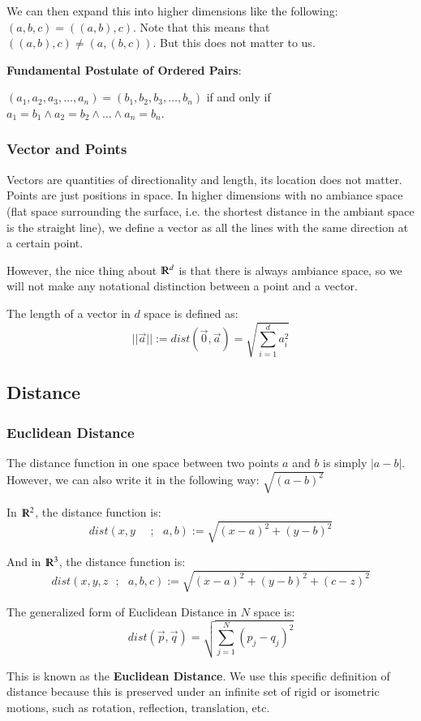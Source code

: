 \documentclass [12 pt, twoside] {book}
\newcommand\+{\text{ }}
\begin{document}
We can then expand this into higher dimensions like the following:
$(a, b, c) = ((a, b), c)$. Note that this means that $((a, b), c) \neq (a, (b,
c))$. But this does not matter to us.

\textbf{Fundamental Postulate of Ordered Pairs}:

$(a_1, a_2, a_3, \dots, a_n) = (b_1, b_2, b_3, \dots, b_n)$ if and only if $a_1
= b_1 \wedge a_2 = b_2 \wedge \dots \wedge a_n = b_n$.
\subsubsection{Vector and Points}
Vectors are quantities of directionality and length, its location does not
matter. Points are just positions in space. In higher dimensions with no
ambiance space (flat space surrounding the surface, i.e. the shortest distance
in the ambiant space is the straight line),  we define a vector as all
the lines with the same direction at a certain point.

However, the nice thing about $\varmathbb{R}^d$ is that there is always ambiance
space, so we will not make any notational distinction between a point and a
vector.

The length of a vector in $d$ space is defined as:
$$||\vec{a}|| := dist(\vec{0}, \vec{a}) = \sqrt{\sum_{i =
1}^d a_i^2}$$


\subsection{Distance}
\subsubsection{Euclidean Distance}
The distance function in one space between two points $a$ and $b$ is simply $|a
- b|$. However, we can also write it in the following way: $\sqrt{(a - b)^2}$

In $\varmathbb{R}^2$, the distance function is:
$$dist(x, y\+\+;\+a,b) := \sqrt{(x - a)^2 + (y - b)^2}$$

And in $\varmathbb{R}^3$, the distance function is:
$$dist(x, y, z\+;\+ a,b,c) := \sqrt{(x - a)^2 + (y - b)^2 + (c - z)^2}$$

The generalized form of Euclidean Distance in $N$ space is:
$$dist(\vec{p}, \vec{q}) = \sqrt{\sum_{j = 1}^N (p_j - q_j)^2}$$

This is known as the \textbf{Euclidean Distance}. We use this specific
definition of distance because this is preserved under an infinite set of rigid
or isometric motions, such as rotation, reflection, translation, etc.
\end{document}
